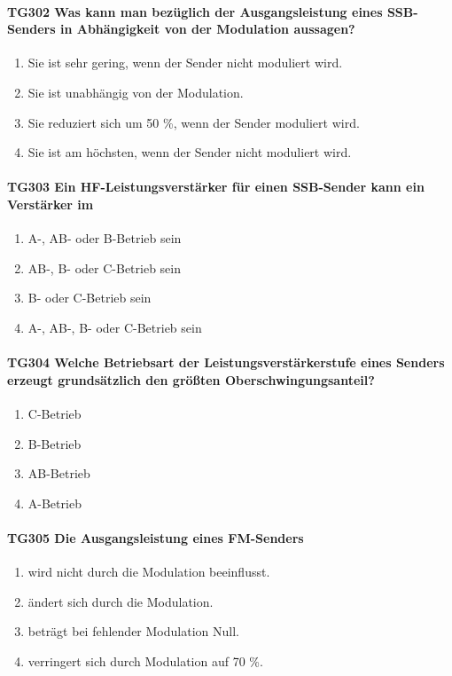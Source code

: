 \documentclass[8pt]{article}
\begin{document}
\paragraph*{TG302 Was kann man bezüglich der Ausgangsleistung eines SSB-Senders in Abhängigkeit von der Modulation aussagen?}
\begin{enumerate}[nolistsep,label=\Alph*]
\item Sie ist sehr gering, wenn der Sender nicht moduliert wird.
\item Sie ist unabhängig von der Modulation.
\item Sie reduziert sich um 50 \%, wenn der Sender moduliert wird.
\item Sie ist am höchsten, wenn der Sender nicht moduliert wird.
\end{enumerate}

\paragraph*{TG303 Ein HF-Leistungsverstärker für einen SSB-Sender kann ein Verstärker im}
\begin{enumerate}[nolistsep,label=\Alph*]
\item A-, AB- oder B-Betrieb sein
\item AB-, B- oder C-Betrieb sein
\item B- oder C-Betrieb sein
\item A-, AB-, B- oder C-Betrieb sein
\end{enumerate}

\paragraph*{TG304 Welche Betriebsart der Leistungsverstärkerstufe eines Senders erzeugt grundsätzlich den größten Oberschwingungsanteil?}
\begin{enumerate}[nolistsep,label=\Alph*]
\item C-Betrieb
\item B-Betrieb
\item AB-Betrieb
\item A-Betrieb
\end{enumerate}

\paragraph*{TG305 Die Ausgangsleistung eines FM-Senders} 
\begin{enumerate}[nolistsep,label=\Alph*]
\item wird nicht durch die Modulation beeinflusst.
\item ändert sich durch die Modulation.
\item beträgt bei fehlender Modulation Null.
\item verringert sich durch Modulation auf 70 \%.
\end{enumerate}
\end{document}
